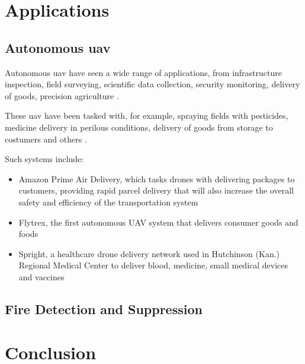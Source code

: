 \documentclass[runningheads]{llncs}
\begin{document}
\section{Applications}

\subsection{Autonomous \acrshort{uav}}

Autonomous \acrshort{uav} have seen a wide range of applications, from  infrastructure inspection, field surveying, scientific data collection, security monitoring, delivery of goods, precision agriculture \cite{Malka_2017}.

These \acrshort{uav} have been tasked with, for example, spraying fields with pesticides, medicine delivery in perilous conditions, delivery of goods from storage to costumers and others \cite{Malka_2017}.

Such systems include:

\begin{itemize}
	\item Amazon Prime Air Delivery, which tasks drones with delivering packages to customers, providing rapid parcel delivery that will also increase the overall safety and efficiency of the transportation system \cite{article}
	\item Flytrex, the first autonomous UAV system that delivers consumer goods and foods \cite{Malka_2017}
	\item Spright, a healthcare drone delivery network used in Hutchinson (Kan.) Regional Medical Center to deliver blood, medicine, small medical devices and vaccines \cite{Drees_2021}
\end{itemize}


\subsection{Fire Detection and Suppression}

\section{Conclusion}


\end{document}
